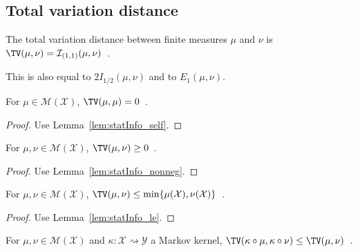 


\subsection{Total variation distance}

\begin{definition}
  \label{def:TV}
  \leanok
  The total variation distance between finite measures $\mu$ and $\nu$ is $\TV(\mu, \nu) = \mathcal I_{(1,1)}(\mu, \nu)$~.
\end{definition}

This is also equal to $2 I_{1/2}(\mu, \nu)$ and to $E_1(\mu, \nu)$.

\begin{lemma}
  \label{lem:tv_self}
  \leanok
  For $\mu \in \mathcal M(\mathcal X)$, $\TV(\mu, \mu) = 0$~.
\end{lemma}

\begin{proof}\leanok
{}
Use Lemma~\ref{lem:statInfo_self}.
\end{proof}

\begin{lemma}
  \label{lem:tv_nonneg}
  \leanok
  For $\mu, \nu \in \mathcal M(\mathcal X)$, $\TV(\mu, \nu) \ge 0$~.
\end{lemma}

\begin{proof}\leanok
{}
Use Lemma~\ref{lem:statInfo_nonneg}.
\end{proof}


\begin{lemma}
  \label{lem:tv_le}
  \leanok
  For $\mu, \nu \in \mathcal M(\mathcal X)$, $\TV(\mu, \nu) \le \min\{\mu(\mathcal X), \nu(\mathcal X)\}$~.
\end{lemma}

\begin{proof}\leanok
{}
Use Lemma~\ref{lem:statInfo_le}.
\end{proof}


\begin{theorem}
  \label{thm:tv_data_proc}
  \leanok
  For $\mu, \nu \in \mathcal M(\mathcal X)$ and $\kappa : \mathcal X \rightsquigarrow \mathcal Y$ a Markov kernel, $\TV(\kappa \circ \mu, \kappa \circ \nu) \le \TV(\mu, \nu)$~.
\end{theorem}

